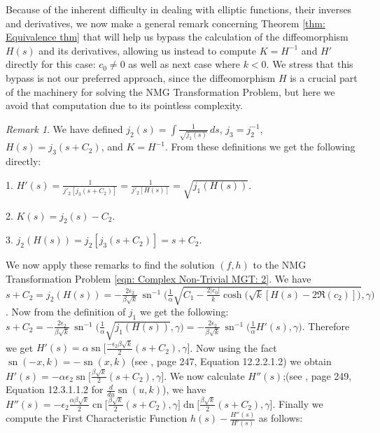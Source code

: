 \documentclass[12pt]{article}
\theoremstyle{plain}
\theoremstyle{definition}
\theoremstyle{remark}
\newtheorem{remark}[theorem]{Remark}
\begin{document}
 Because of the inherent difficulty in dealing with elliptic functions, their inverses and derivatives, we now make a general remark concerning Theorem \ref{thm: Equivalence thm} that will help us bypass the calculation of the diffeomorphism \(H(s)\) and its derivatives, allowing us instead to compute \(K=H^{-1}\) and \(H'\) directly for this case: \(c_0\neq 0\) as well as next case where \(k<0\).  We stress that this bypass is not our preferred approach, since the diffeomorphism \(H\) is a crucial part of the machinery for solving the NMG Transformation Problem, but here we avoid that computation due to its pointless complexity.
\begin{remark}\label{remark: bypassing H}
	We have defined \(j_2(s)=\int\frac{1}{\sqrt{j_1(s)}}\,ds\), \(j_3=j_2^{-1}\), \(H(s)=j_3(s+C_2)\), and \(K=H^{-1}\).  From these definitions we get the following directly:
	
	1. \(H'(s)=\tfrac{1}{{j'_2}[j_3(s+C_2)]}=\tfrac{1}{j'_2[H(s)]}=\sqrt{j_1(H(s))}\). 
	
	2. \(K(s)=j_2(s)-C_2\).
	
	3. \(j_2(H(s))=j_2[j_3(s+C_2)]=s+C_2\).
\end{remark} 
We now apply these remarks to find the solution \((f,h)\) to the NMG Transformation Problem \ref{eqn: Complex Non-Trivial MGT: 2}. We have  \footnotesize\(s+C_2=j_2(H(s))=-\tfrac{2\epsilon_2}{\beta\sqrt k}\,\operatorname{sn}^{-1} \big(\tfrac{1}{\alpha}\sqrt{C_1 - \tfrac{2|c_0|}{k}\cosh\big(\sqrt k[H(s)-2\Re(c_2)]\big)},\gamma \big)\)\normalsize. Now from the definition of \(j_1\) we get the following: \(s+C_2=-\tfrac{2\epsilon_2}{\beta\sqrt k}\,\operatorname{sn}^{-1} \big(\tfrac{1}{\alpha}\sqrt{j_1(H(s))},\gamma \big)=-\tfrac{2\epsilon_2}{\beta\sqrt k}\,\operatorname{sn}^{-1} \big(\tfrac{1}{\alpha} H'(s),\gamma \big)\). Therefore we get \(H'(s)=\alpha\operatorname{sn}\big[\tfrac{-\epsilon_2\beta\sqrt k}{2}(s+C_2),\gamma\big]\). Now using the fact \(\operatorname{sn}(-x,k)=-\operatorname{sn}(x,k)\) (see \cite{JD}, page 247, Equation 12.2.2.1.2) we obtain \(H'(s)=-\alpha\epsilon_2\operatorname{sn}\big[\tfrac{\beta\sqrt k}{2}(s+C_2),\gamma\big]\). We now calculate \(H''(s)\);(see \cite{JD}, page 249, Equation 12.3.1.1.2 for \(\tfrac{d}{du}\operatorname{sn}(u,k)\)), we have \footnotesize\(H''(s)=-\epsilon_2\tfrac{\alpha\beta\sqrt k}{2}\operatorname{cn}\big[\tfrac{\beta\sqrt k}{2}(s+C_2),\gamma\big]\operatorname{dn}\big[\tfrac{\beta\sqrt k}{2}(s+C_2),\gamma\big]\)\normalsize. Finally we compute the First Characteristic Function \(h(s)-\tfrac{H''(s)}{H'(s)}\) as follows:
\end{document}
